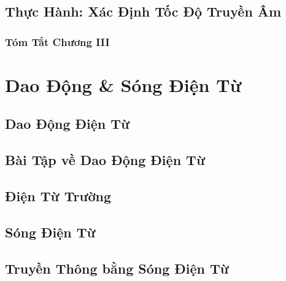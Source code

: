 \documentclass{article}
\numberwithin{equation}{section}
\begin{document}
\subsection{Thực Hành: Xác Định Tốc Độ Truyền Âm}


\subsubsection{Tóm Tắt Chương III}


\section{Dao Động \& Sóng Điện Từ}

\subsection{Dao Động Điện Từ}


\subsection{Bài Tập về Dao Động Điện Từ}


\subsection{Điện Từ Trường}


\subsection{Sóng Điện Từ}


\subsection{Truyền Thông bằng Sóng Điện Từ}
\end{document}
